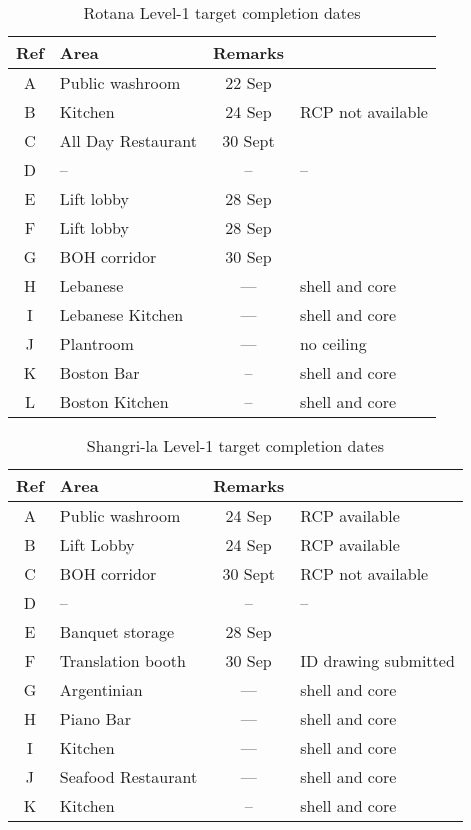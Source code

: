 \newcommand{\submitted}{RCP drawing submitted}
\newcommand{\notavailable}{RCP not available}
\begin{table}[htbp]
\begin{center}
\begin{tabular}{clcl}
\toprule
Ref  & Area  & Remarks \\
\midrule
A     &Public washroom  &22 Sep &  \\
B      &Kitchen  &24 Sep & \notavailable  \\
C      &All Day Restaurant & 30 Sept &  \\
D      &-- &-- &--  \\
E      &Lift lobby &28 Sep &  \\
F      &Lift lobby &28 Sep &  \\
G     &BOH corridor&30 Sep &  \\
H     &Lebanese & --- & shell and core \\
I      &Lebanese Kitchen &--- & shell and core \\
J      &Plantroom &--- &  no ceiling\\
K     &Boston Bar & -- &  shell and core \\
L     &Boston Kitchen & -- & shell and core\\
\bottomrule
\end{tabular}
\caption{Rotana Level-1  target completion dates}
\end{center}
\end{table}


\begin{table}[htbp]
\begin{center}
\begin{tabular}{clcl}
\toprule
Ref  & Area  & Remarks \\
\midrule
A     &Public washroom  &24 Sep &RCP available  \\
B      &Lift Lobby  &24 Sep & RCP available  \\
C      &BOH corridor & 30 Sept & RCP not available \\
D      &-- &-- &--  \\
E      &Banquet storage &28 Sep &  \\
F      &Translation booth &30 Sep & ID drawing submitted \\
G     &Argentinian &--- & shell and core  \\
H     &Piano Bar & --- & shell and core \\
I      & Kitchen &--- & shell and core \\
J      &Seafood Restaurant &--- & shell and core\\
K     &Kitchen & -- &  shell and core \\
\bottomrule
\end{tabular}
\caption{Shangri-la Level-1  target completion dates}
\end{center}
\end{table}





